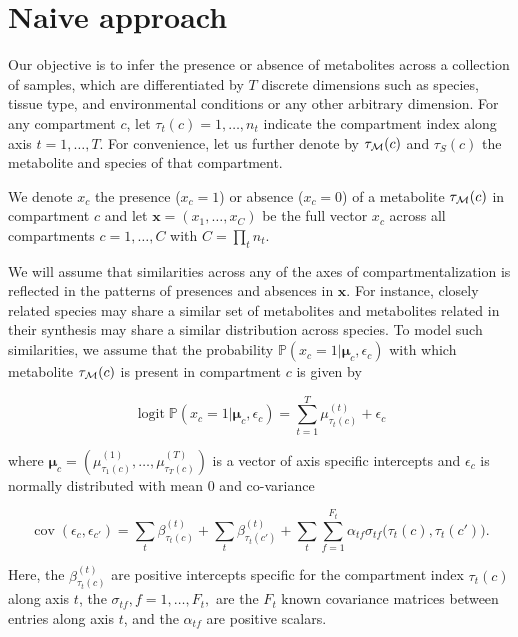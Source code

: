 \documentclass[
11pt, %
oneside, %
english, %
singlespacing, %
headsepline, %
chapterinoneline, %
]{MastersDoctoralThesis} %
\DeclareMathOperator{\logit}{logit}
\DeclareMathOperator{\cov}{cov}
\def\P{\mathbb{P}}
\def\x{\boldsymbol{x}}
\def\bmu{\boldsymbol{\mu}}
\def\M{{\cal M}}
\begin{document}
\section{Naive approach}\label{sec:methods:Naive approach}
Our objective is to infer the presence or absence of metabolites across a collection of samples, which are differentiated by $T$ discrete dimensions such as species, tissue type, and environmental conditions or any other arbitrary dimension. For any compartment $c$, let $\tau_t(c) = 1, \ldots, n_t$ indicate the compartment index along axis $t=1, \ldots, T$. For convenience, let us further denote by $\tau_\M(c)$ and $\tau_S(c)$ the metabolite and species of that compartment.

We denote $x_{c}$ the presence ($x_c=1$) or absence ($x_c=0$) of a metabolite $\tau_\M(c)$ in compartment $c$ and let $\x=(x_1, \ldots, x_C)$ be the full vector $x_c$ across all compartments $c=1, \ldots, C$ with $C=\prod_t n_t$.

We will assume that similarities across any of the axes of compartmentalization is reflected in the patterns of presences and absences in $\x$. For instance, closely related species may share a similar set of metabolites and  metabolites related in their synthesis may share a similar distribution across species. To model such similarities, we assume that the probability $\P(x_c=1|\bmu_c, \epsilon_c)$ with which metabolite $\tau_\M(c)$ is present in compartment $c$ is given by

\begin{equation}\label{eq:logit of X}
	\logit \P(x_c=1|\bmu_c, \epsilon_c) = \sum_{t=1}^{T} \mu^{(t)}_{\tau_t(c)} + \epsilon_{c}
\end{equation}

where $\bmu_c=(\mu^{(1)}_{\tau_1(c)}, \ldots, \mu^{(T)}_{\tau_T(c)})$ is a vector of axis specific intercepts and $\epsilon_{c}$ is normally distributed with mean 0 and co-variance

\begin{equation}
	\cov(\epsilon_c, \epsilon_{c'}) = \sum_t \beta^{(t)}_{\tau_t(c)} + \sum_t \beta^{(t)}_{\tau_t(c')} + \sum_t \sum_{f=1}^{F_t} \alpha_{tf} \sigma_{tf}\Big(\tau_t(c), \tau_t(c')\Big).
\end{equation}

Here, the $\beta^{(t)}_{\tau_t(c)}$ are positive intercepts specific for the compartment index $\tau_t(c)$ along axis $t$, the $\sigma_{tf}, f=1, \ldots, F_t,$ are the $F_t$ known covariance matrices between entries along axis $t$, and the $\alpha_{tf}$ are positive scalars.
\end{document}
